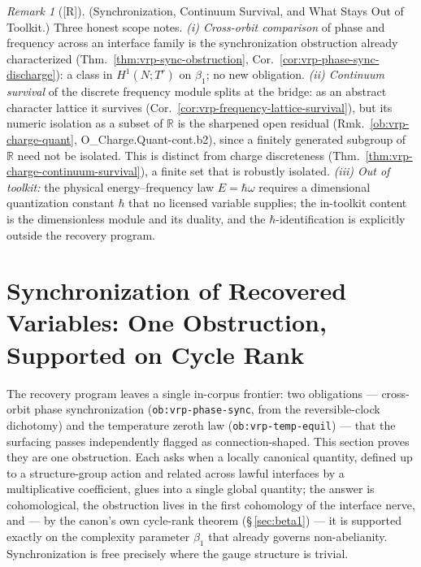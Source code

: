 \documentclass[12pt,oneside]{amsbook}
\theoremstyle{plain}
\theoremstyle{definition}
\theoremstyle{remark}
\newtheorem{remark}[theorem]{Remark}
\newcommand{\status}[1]{\textup{[#1]}}
\begin{document}
\begin{remark}[\status{R}]\label{rmk:vrp-frequency-scope}
\textup{(Synchronization, Continuum Survival, and What Stays Out of
Toolkit.)}
Three honest scope notes.  \emph{(i) Cross-orbit comparison} of phase
and frequency across an interface family is the synchronization
obstruction already characterized (Thm.~\ref{thm:vrp-sync-obstruction},
Cor.~\ref{cor:vrp-phase-sync-discharge}): a class in $H^1(N;T^r)$ on
$\beta_1$; no new obligation.  \emph{(ii) Continuum survival} of the
discrete frequency module splits at the bridge: as an abstract character
lattice it survives (Cor.~\ref{cor:vrp-frequency-lattice-survival}), but
its numeric isolation as a subset of $\mathbb{R}$ is the sharpened open
residual (Rmk.~\ref{ob:vrp-charge-quant}, O\_Charge.Quant-cont.b2), since
a finitely generated subgroup of $\mathbb{R}$ need not be isolated. This
is distinct from charge discreteness
(Thm.~\ref{thm:vrp-charge-continuum-survival}), a finite set that is
robustly isolated.  \emph{(iii) Out of toolkit:} the
physical energy--frequency law $E=\hbar\omega$ requires a dimensional
quantization constant $\hbar$ that no licensed variable supplies; the
in-toolkit content is the dimensionless module and its duality, and the
$\hbar$-identification is explicitly outside the recovery program.
\end{remark}

\section{Synchronization of Recovered Variables: One Obstruction,
Supported on Cycle Rank}
\label{sec:vrp-sync}

The recovery program leaves a single in-corpus frontier: two
obligations --- cross-orbit phase synchronization
(\texttt{ob:vrp-phase-sync}, from the reversible-clock dichotomy)
and the temperature zeroth law (\texttt{ob:vrp-temp-equil}) ---
that the surfacing passes independently flagged as
connection-shaped.  This section proves they are one obstruction.
Each asks when a locally canonical quantity, defined up to a
structure-group action and related across lawful interfaces by a
multiplicative coefficient, glues into a single global quantity;
the answer is cohomological, the obstruction lives in the first
cohomology of the interface nerve, and --- by the canon's own
cycle-rank theorem (\S\,\ref{sec:beta1}) --- it is supported
exactly on the complexity parameter $\beta_1$ that already governs
non-abelianity.  Synchronization is free precisely where the gauge
structure is trivial.
\end{document}
